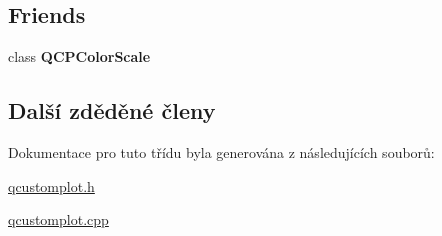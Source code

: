 \subsection*{Friends}
\begin{DoxyCompactItemize}
\item 
\hypertarget{classQCPColorScaleAxisRectPrivate_a60f6031408a325ebd1bbbad1ccf9b897}{}class {\bfseries Q\+C\+P\+Color\+Scale}\label{classQCPColorScaleAxisRectPrivate_a60f6031408a325ebd1bbbad1ccf9b897}

\end{DoxyCompactItemize}
\subsection*{Další zděděné členy}


Dokumentace pro tuto třídu byla generována z následujících souborů\+:\begin{DoxyCompactItemize}
\item 
\hyperlink{qcustomplot_8h}{qcustomplot.\+h}\item 
\hyperlink{qcustomplot_8cpp}{qcustomplot.\+cpp}\end{DoxyCompactItemize}
